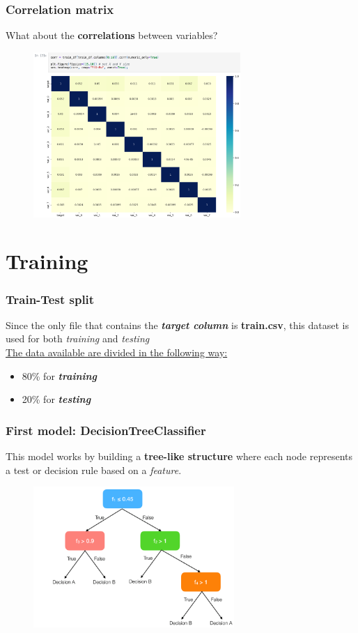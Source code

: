 \documentclass{beamer}
\begin{document}
\begin{frame}
\frametitle{Correlation matrix}
What about the \textbf{correlations} between variables?
\begin{figure}
\centering
    \includegraphics[width=0.7\textwidth]{imgs/matrix.png}
    \label{fig:matrix}
\end{figure}
\end{frame}


\section{Training}

\begin{frame}
\frametitle{Train-Test split}
Since the only file that contains the \textbf{\textit{target column}} is \textbf{train.csv}, this dataset is used for both \textit{training} and \textit{testing}
\newline\\
\underline{The data available are divided in the following way:}
\begin{itemize}
    \item 80\% for \textit{\textbf{training}}
    \item 20\% for \textit{\textbf{testing}}
\end{itemize}
\end{frame}

\begin{frame}
\frametitle{First model: \textbf{DecisionTreeClassifier}}
This model works by building a \textbf{tree-like structure} where each node represents a test or decision rule based on a \textit{feature}.
\begin{figure}
\centering
    \includegraphics[width=0.68\textwidth]{imgs/dtc.png}
    \label{fig:dtc}
\end{figure}
\end{frame}
\end{document}
